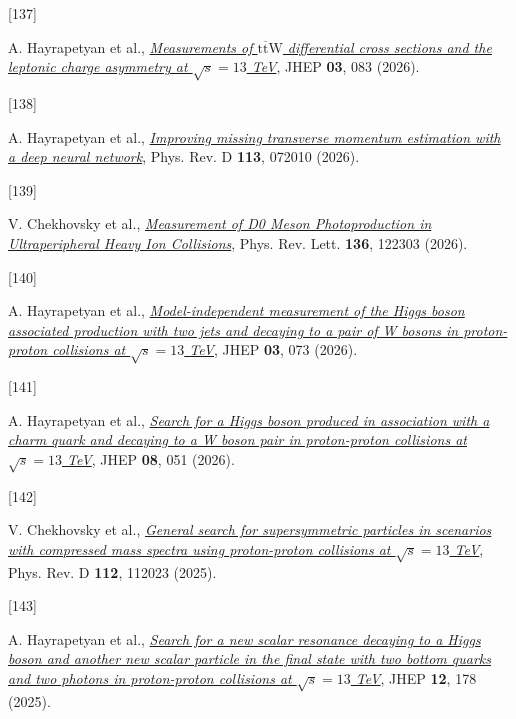 \documentclass[
]{article}
\newlength{\cslhangindent}
\newlength{\csllabelwidth}
\newenvironment{CSLReferences}[2] %
 {\begin{list}{}{%
  \setlength{\itemindent}{0pt}
  \setlength{\leftmargin}{0pt}
  \setlength{\parsep}{0pt}
  \ifodd #1
   \setlength{\leftmargin}{\cslhangindent}
   \setlength{\itemindent}{-1\cslhangindent}
  \fi
  \setlength{\itemsep}{#2\baselineskip}}}
 {\end{list}}
\newcommand{\CSLLeftMargin}[1]{\parbox[t]{\csllabelwidth}{\strut#1\strut}}
\newcommand{\CSLRightInline}[1]{\parbox[t]{\linewidth - \csllabelwidth}{\strut#1\strut}}
\begin{document}
\begin{CSLReferences}{0}{0}
\CSLLeftMargin{{[}137{]} }%
\CSLRightInline{A. Hayrapetyan et al.,
\emph{\href{https://doi.org/10.1007/JHEP03(2026)083}{{Measurements of
\(\textrm{t}\overline{\textrm{t}}\textrm{W}\) differential cross
sections and the leptonic charge asymmetry at \(\sqrt{s}=13\) TeV}}},
JHEP \textbf{03}, 083 (2026).}

\CSLLeftMargin{{[}138{]} }%
\CSLRightInline{A. Hayrapetyan et al.,
\emph{\href{https://doi.org/10.1103/c4z7-tqvc}{{Improving missing
transverse momentum estimation with a deep neural network}}}, Phys. Rev.
D \textbf{113}, 072010 (2026).}

\CSLLeftMargin{{[}139{]} }%
\CSLRightInline{V. Chekhovsky et al.,
\emph{\href{https://doi.org/10.1103/lckg-sdh9}{{Measurement of D0 Meson
Photoproduction in Ultraperipheral Heavy Ion Collisions}}}, Phys. Rev.
Lett. \textbf{136}, 122303 (2026).}

\CSLLeftMargin{{[}140{]} }%
\CSLRightInline{A. Hayrapetyan et al.,
\emph{\href{https://doi.org/10.1007/JHEP03(2026)073}{{Model-independent
measurement of the Higgs boson associated production with two jets and
decaying to a pair of W bosons in proton-proton collisions at
\(\sqrt{s}=13\) TeV}}}, JHEP \textbf{03}, 073 (2026).}

\CSLLeftMargin{{[}141{]} }%
\CSLRightInline{A. Hayrapetyan et al.,
\emph{\href{https://doi.org/10.1007/JHEP08(2026)051}{{Search for a Higgs
boson produced in association with a charm quark and decaying to a W
boson pair in proton-proton collisions at \(\sqrt{s}=13\) TeV}}}, JHEP
\textbf{08}, 051 (2026).}

\CSLLeftMargin{{[}142{]} }%
\CSLRightInline{V. Chekhovsky et al.,
\emph{\href{https://doi.org/10.1103/b26z-zmpy}{{General search for
supersymmetric particles in scenarios with compressed mass spectra using
proton-proton collisions at \(\sqrt{s}=13\) TeV}}}, Phys. Rev. D
\textbf{112}, 112023 (2025).}

\CSLLeftMargin{{[}143{]} }%
\CSLRightInline{A. Hayrapetyan et al.,
\emph{\href{https://doi.org/10.1007/JHEP12(2025)178}{{Search for a new
scalar resonance decaying to a Higgs boson and another new scalar
particle in the final state with two bottom quarks and two photons in
proton-proton collisions at \(\sqrt{s}=13\) TeV}}}, JHEP \textbf{12},
178 (2025).}


\end{CSLReferences}
\end{document}
